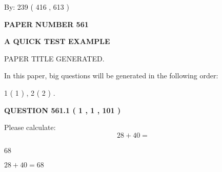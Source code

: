 \documentclass[12pt]{article}
\begin{document}
   
\hspace{1.0in} By: 
 239 ( 416 ,  613 )
   
   
   
   
\newpage 
\setcounter{page}{ 
   561001 } 
   
   
   
   
 {\textbf{ \Large{ PAPER NUMBER  561  }}}
   
   
\vspace{0.2in}
   
   
   
   
   
   
   
   
 \vspace{0.2in}
{\LARGE {\textbf{ A QUICK TEST EXAMPLE}}}
   
   
 PAPER TITLE GENERATED.
   
   
   
\vspace{0.2in}
   
In this paper, big questions will be generated in the following order: 
   
   
   1 ( 1 )
 ,
   2 ( 2 )
 .
  
\vspace{0.2in}
  
{\textbf{\Large{QUESTION
561.1 
 ( 1 , 1 , 101 )
}}}
  
  
 
Please calculate:
\begin{equation}
28 +  %
40 = \nonumber
\end{equation}
 
 
 
\noindent{}
 
 

68
 
 
\noindent{}
 
 

 
 
 
\noindent{}
 
 

$ %
28 +  %
40=   %
68$
 
 
\noindent{}
 
\end{document}
